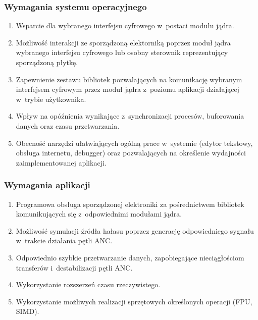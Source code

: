 \subsubsection{Wymagania systemu operacyjnego}

\begin{enumerate}

    \item Wsparcie dla wybranego interfejsu cyfrowego w~postaci modułu jądra.

    \item Możliwość interakcji ze sporządzoną elektorniką poprzez moduł jądra
    wybranego interfejsu cyfrowego lub osobny sterownik reprezentujący
    sporządzoną płytkę.

    \item Zapewnienie zestawu bibliotek pozwalających na komunikację wybranym
    interfejsem cyfrowym przez moduł jądra z~poziomu aplikacji działającej
    w~trybie użytkownika.

    \item Wpływ na opóźnienia wynikające z~synchronizacji procesów, buforowania
    danych oraz czasu przetwarzania.

    \item Obecność narzędzi ułatwiających ogólną prace w~systemie (edytor
    tekstowy, obsługa internetu, debugger) oraz pozwalających na określenie
    wydajności zaimplementowanej aplikacji.

\end{enumerate}

\subsubsection{Wymagania aplikacji}

\begin{enumerate}

    \item Programowa obsługa sporządzonej elektroniki za pośrednictwem bibliotek
    komunikujących się z~odpowiednimi modułami jądra.

    \item Możliwość symulacji źródła hałasu poprzez generację odpowiedniego
    sygnału w~trakcie działania pętli ANC.

    \item Odpowiednio szybkie przetwarzanie danych, zapobiegające nieciągłościom
    transferów i~destabilizacji pętli ANC.

    \item Wykorzystanie rozszerzeń czasu rzeczywistego. 

    \item Wykorzystanie możliwych realizacji sprzętowych określonych operacji
    (FPU, SIMD).

\end{enumerate}

